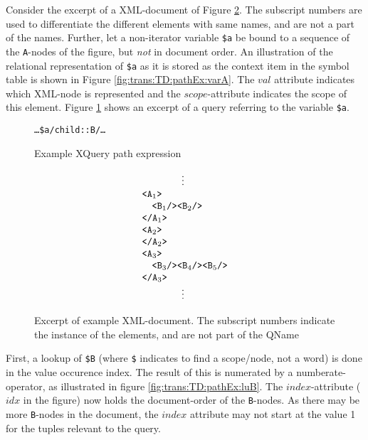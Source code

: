 \begin{myExample}
Consider the excerpt of a XML-document of Figure \ref{fig:trans:TD:pathExXml}.
The subscript numbers are used to differentiate the different elements with same names, and are not a part of the names. Further, let a non-iterator
variable \texttt{\$a} be bound to a sequence of the \texttt{A}-nodes of the figure, but \emph{not} in document
order. An illustration of the relational representation of \texttt{\$a} as it is stored as the context item in the
symbol table is shown in Figure \ref{fig:trans:TD:pathEx:varA}. The $val$ attribute indicates which XML-node is
represented and the $scope$-attribute indicates the scope of this element. Figure \ref{fig:trans:TD:pathQu} shows
an excerpt of a query referring to the variable \texttt{\$a}. \begin{figure}[h!]
\centering
\texttt{\ldots\$a/child::B/\ldots}
\caption{Example XQuery path expression \label{fig:trans:TD:pathQu}}
\end{figure} 

\begin{figure}[h]
\centering
\begin{equation*}
\begin{array}{l}
\qquad \qquad \vdots \\
\mbox{\texttt{<A}}_{1}\mbox{\texttt{>}} \\ \quad
\mbox{\texttt{<B}}_{1}\mbox{\texttt{/>}}\mbox{\texttt{<B}}_{2}\mbox{\texttt{/>}} \\
\mbox{\texttt{</A}}_{1}\mbox{\texttt{>}} \\
\mbox{\texttt{<A}}_{2}\mbox{\texttt{>}} \\ 
\mbox{\texttt{</A}}_{2}\mbox{\texttt{>}} \\
\mbox{\texttt{<A}}_{3}\mbox{\texttt{>}} \\ \quad
\mbox{\texttt{<B}}_{3}\mbox{\texttt{/>}}\mbox{\texttt{<B}}_{4}\mbox{\texttt{/>}}\mbox{\texttt{<B}}_{5}\mbox{\texttt{/>}}
\\ \mbox{\texttt{</A}}_{3}\mbox{\texttt{>}} \\
\qquad \qquad \vdots
\end{array}
\end{equation*}
\caption[Excerpt of example XML-document.]{Excerpt of example XML-document. The
subscript numbers indicate the instance of the elements, and are not part of the QName \label{fig:trans:TD:pathExXml}}
\end{figure}

First, a lookup of \texttt{\$B} (where \texttt{\$} indicates to find a scope/node, not a word) is done in the
value occurence index. The result of this is numerated by a \textsf{numberate}-operator, as illustrated in figure
\ref{fig:trans:TD:pathEx:luB}. The $index$-attribute ($idx$ in the figure) now holds the document-order of the
\texttt{B}-nodes. As there may be more \texttt{B}-nodes in the document, the $index$ attribute may not start
at the value 1 for the tuples relevant to the query.


\end{myExample}
